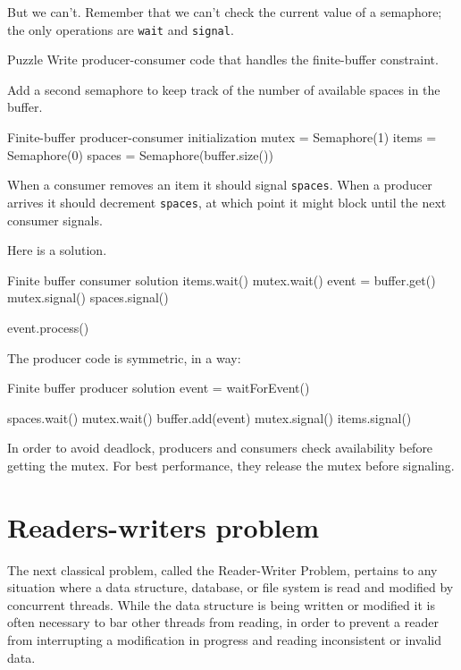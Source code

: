 But we can't.  Remember that we can't check the current
value of a semaphore; the only operations are {\tt wait}
and {\tt signal}.

\begin{puzzlebox}{Puzzle}
Write producer-consumer code that handles the finite-buffer
constraint.


Add a second semaphore to keep track of the number of
available spaces in the buffer.

\begin{lstbox}{Finite-buffer producer-consumer initialization}
mutex = Semaphore(1)
items = Semaphore(0)
spaces = Semaphore(buffer.size())
\end{lstbox}

When a consumer removes an item it should signal {\tt spaces}.
When a producer arrives it should decrement {\tt spaces}, at
which point it might block until the next consumer signals.
\end{puzzlebox}



Here is a solution.

\begin{lstbox}{Finite buffer consumer solution}
items.wait()
mutex.wait()
    event = buffer.get()
mutex.signal()
spaces.signal()

event.process()
\end{lstbox}

The producer code is symmetric, in a way:

\begin{lstbox}{Finite buffer producer solution}
event = waitForEvent()

spaces.wait()
mutex.wait()
    buffer.add(event)
mutex.signal()
items.signal()
\end{lstbox}

In order to avoid deadlock, producers and consumers check
availability before getting the mutex.  For best performance,
they release the mutex before signaling.


\blankpage
\section{Readers-writers problem} 

The next classical problem, called the Reader-Writer Problem, pertains
to any situation where a data structure, database, or file system is
read and modified by concurrent threads.  While the data structure is
being written or modified it is often necessary to bar other threads
from reading, in order to prevent a reader from interrupting a
modification in progress and reading inconsistent or invalid data.

